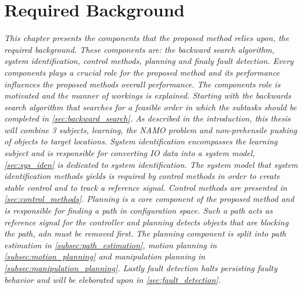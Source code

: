 \chapter{Required Background}%
\label{chap:required_background}
\textit{This chapter presents the components that the proposed method relies upon, the required background. These components are: the backward search algorithm, system identification, control methods, planning and finaly fault detection. Every components plays a crucial role for the proposed method and its performance influences the proposed methods overall performance. The components role is motivated and the manner of workings is explained. Starting with the backwards search algorithm that searches for a feasible order in which the subtasks should be completed in \cref{sec:backward_search}. As described in the introduction, this thesis will combine 3 subjects, learning, the \ac{NAMO} problem and non-prehensile pushing of objects to target locations. System identification encompasses the learning subject and is responsible for converting \ac{IO} data into a system model, \cref{sec:sys_iden} is dedicated to system identification. The system model that system identification methods yields is required by control methods in order to create stable control and to track a reference signal. Control methods are presented in \cref{sec:control_methods}. Planning is a core component of the proposed method and is responsible for finding a path in configuration space. Such a path acts as reference signal for the controller and planning detects objects that are blocking the path, adn must be removed first. The planning component is split into path estimation in \cref{subsec:path_estimation}, motion planning in \cref{subsec:motion_planning} and manipulation planning in \cref{subsec:manipulation_planning}. Lastly fault detection halts persisting faulty behavior and will be eleborated upon in \cref{sec:fault_detection}.\bs}







